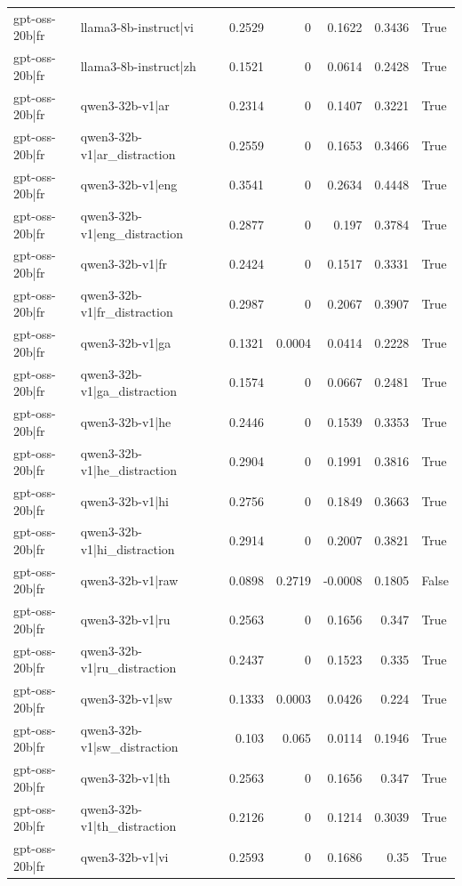 \begin{table}
\begin{tabular}{l l r r r r l}
gpt-oss-20b|fr & llama3-8b-instruct|vi & 0.2529 & 0 & 0.1622 & 0.3436 & True \\
gpt-oss-20b|fr & llama3-8b-instruct|zh & 0.1521 & 0 & 0.0614 & 0.2428 & True \\
gpt-oss-20b|fr & qwen3-32b-v1|ar & 0.2314 & 0 & 0.1407 & 0.3221 & True \\
gpt-oss-20b|fr & qwen3-32b-v1|ar_distraction & 0.2559 & 0 & 0.1653 & 0.3466 & True \\
gpt-oss-20b|fr & qwen3-32b-v1|eng & 0.3541 & 0 & 0.2634 & 0.4448 & True \\
gpt-oss-20b|fr & qwen3-32b-v1|eng_distraction & 0.2877 & 0 & 0.197 & 0.3784 & True \\
gpt-oss-20b|fr & qwen3-32b-v1|fr & 0.2424 & 0 & 0.1517 & 0.3331 & True \\
gpt-oss-20b|fr & qwen3-32b-v1|fr_distraction & 0.2987 & 0 & 0.2067 & 0.3907 & True \\
gpt-oss-20b|fr & qwen3-32b-v1|ga & 0.1321 & 0.0004 & 0.0414 & 0.2228 & True \\
gpt-oss-20b|fr & qwen3-32b-v1|ga_distraction & 0.1574 & 0 & 0.0667 & 0.2481 & True \\
gpt-oss-20b|fr & qwen3-32b-v1|he & 0.2446 & 0 & 0.1539 & 0.3353 & True \\
gpt-oss-20b|fr & qwen3-32b-v1|he_distraction & 0.2904 & 0 & 0.1991 & 0.3816 & True \\
gpt-oss-20b|fr & qwen3-32b-v1|hi & 0.2756 & 0 & 0.1849 & 0.3663 & True \\
gpt-oss-20b|fr & qwen3-32b-v1|hi_distraction & 0.2914 & 0 & 0.2007 & 0.3821 & True \\
gpt-oss-20b|fr & qwen3-32b-v1|raw & 0.0898 & 0.2719 & -0.0008 & 0.1805 & False \\
gpt-oss-20b|fr & qwen3-32b-v1|ru & 0.2563 & 0 & 0.1656 & 0.347 & True \\
gpt-oss-20b|fr & qwen3-32b-v1|ru_distraction & 0.2437 & 0 & 0.1523 & 0.335 & True \\
gpt-oss-20b|fr & qwen3-32b-v1|sw & 0.1333 & 0.0003 & 0.0426 & 0.224 & True \\
gpt-oss-20b|fr & qwen3-32b-v1|sw_distraction & 0.103 & 0.065 & 0.0114 & 0.1946 & True \\
gpt-oss-20b|fr & qwen3-32b-v1|th & 0.2563 & 0 & 0.1656 & 0.347 & True \\
gpt-oss-20b|fr & qwen3-32b-v1|th_distraction & 0.2126 & 0 & 0.1214 & 0.3039 & True \\
gpt-oss-20b|fr & qwen3-32b-v1|vi & 0.2593 & 0 & 0.1686 & 0.35 & True \\

\end{tabular}
\end{table}
